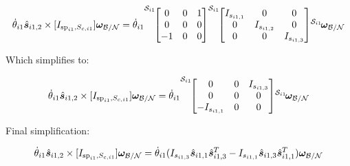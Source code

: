 \documentclass[paper]{aiaaNew}
\begin{document}
\begin{equation}
\dot{\theta}_{i1} \hat{\bm s}_{i1,2} \times [I_{\text{sp}_{i1},S_{c,i1}}]\bm \omega_{\cal{B/N}} = \dot{\theta}_{i1} {\vphantom{\begin{bmatrix}
		0 & 0 & 1 \\
		0 & 0 & 0 \\
		-1 & 0 & 0
		\end{bmatrix}}}^{\mathcal{S}_{i1}\!}{\begin{bmatrix}
	0 & 0 & 1 \\
	0 & 0 & 0 \\
	-1 & 0 & 0
	\end{bmatrix}} {\vphantom{\begin{bmatrix}
		I_{s_{i1,1}} & 0 & 0 \\
		0 & I_{s_{i1,2}} & 0 \\
		0 & 0 & I_{s_{i1,3}}
		\end{bmatrix}}}^{\mathcal{S}_{i1}\!}{\begin{bmatrix}
	I_{s_{i1,1}} & 0 & 0 \\
	0 & I_{s_{i1,2}} & 0 \\
	0 & 0 & I_{s_{i1,3}}
	\end{bmatrix}} {\vphantom{\bm \omega_{\cal{B/N}}}}^{\mathcal{S}_{i1}\!}{\bm \omega_{\cal{B/N}}}  
\end{equation}

Which simplifies to:

\begin{equation}
\dot{\theta}_{i1} \hat{\bm s}_{i1,2} \times [I_{\text{sp}_{i1},S_{c,i1}}]\bm \omega_{\cal{B/N}} = \dot{\theta}_{i1} {\vphantom{\begin{bmatrix}
		0 & 0 & I_{s_{i1,3}} \\
		0 & 0 & 0 \\
		-I_{s_{i1,1}} & 0 & 0
		\end{bmatrix}}}^{\mathcal{S}_{i1}\!}{\begin{bmatrix}
	0 & 0 & I_{s_{i1,3}} \\
	0 & 0 & 0 \\
	-I_{s_{i1,1}} & 0 & 0
	\end{bmatrix}} {\vphantom{\bm \omega_{\cal{B/N}}}}^{\mathcal{S}_{i1}\!}{\bm \omega_{\cal{B/N}}}  
\end{equation}

Final simplification:

\begin{equation}
\dot{\theta}_{i1} \hat{\bm s}_{i1,2} \times [I_{\text{sp}_{i1},S_{c,i1}}]\bm \omega_{\cal{B/N}} = \dot{\theta}_{i1} (I_{s_{i1,3}} \hat{\bm s}_{i1,1} \hat{\bm s}_{i1,3}^T - I_{s_{i1,1}} \hat{\bm s}_{i1,3} \hat{\bm s}_{i1,1}^T) \bm \omega_{\cal{B/N}}
\end{equation}
\end{document}
